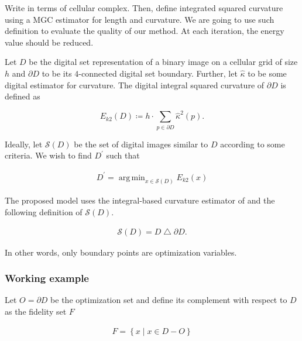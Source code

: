 \documentclass[runningheads]{llncs}
\DeclareMathOperator*{\argmin}{arg\,min}
\begin{document}
Write in terms of cellular complex. Then, define integrated squared curvature using a MGC estimator for length and curvature. We are going to use such definition to evaluate the quality of our method. At each iteration, the energy value should be reduced.

Let $D$ be the digital set representation of a binary image on a cellular grid of size $h$ and $\partial D$ to be its $4$-connected digital set boundary. Further, let $\hat{\kappa}$ to be some digital estimator for curvature. The digital integral squared curvature of $\partial D$ is defined as
		
		\begin{equation}
			E_{k2}(D) \coloneqq  h \cdot \sum_{p \in \partial D}{ \hat{\kappa}^2(p) }.
		\end{equation}
		
		
		Ideally, let $\mathcal{S}(D)$ be the set of digital images similar to $D$ according to some criteria. We wish to find $D^\prime$ such that 

\begin{align}
	D^\prime = \argmin_{x \in \mathcal{S}(D)} E_{k2}(x)\label{eqn:minimum_boundary}
\end{align}
	
	The proposed model uses the integral-based curvature estimator of \cite{coeurjolly13} and the following definition of $\mathcal{S}(D)$.
	
	\begin{align*}
		\mathcal{S}(D) = D \bigtriangleup \partial D.
	\end{align*}
	
	In other words, only boundary points are optimization variables.
	
	\subsubsection{Working example}

	Let $O=\partial D$ be the optimization set and define its complement with respect to $D$ as the fidelity set $F$
	
	\begin{align*}
		F = \left\lbrace x \mid x \in D - O \right\rbrace
	\end{align*}
	
\end{document}
